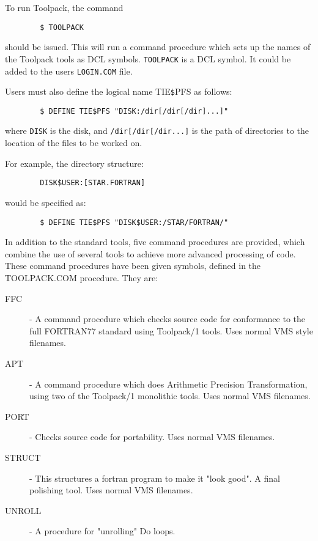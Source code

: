 To run Toolpack, the command
\begin{verbatim}
        $ TOOLPACK
\end{verbatim}
should be issued. This will run a command procedure which sets up the names
of the Toolpack tools as DCL symbols. {\tt TOOLPACK} is a DCL symbol. It could
be added to the users {\tt LOGIN.COM} file.

Users must also define the logical name TIE{\tt{\$}}PFS as follows:
\begin{verbatim}
        $ DEFINE TIE$PFS "DISK:/dir[/dir[/dir]...]"
\end{verbatim}
where {\tt DISK} is the disk, and {\tt /dir[/dir[/dir...]} is the path of
directories to the location of the files to be worked on.

For example, the directory
structure:
\begin{verbatim}
        DISK$USER:[STAR.FORTRAN]
\end{verbatim}
would be specified as:
\begin{verbatim}
        $ DEFINE TIE$PFS "DISK$USER:/STAR/FORTRAN/"
\end{verbatim}
In addition to the standard tools, five command procedures are provided, which
combine the use of several tools to achieve more advanced processing of code.
These command procedures have been given symbols, defined in the TOOLPACK.COM
procedure. They are:
\begin{description}
\item [FFC] -
A command procedure which checks source code for conformance to the full
FORTRAN77 standard using Toolpack/1 tools. Uses normal VMS style filenames.
\item [APT] -
A command procedure which does Arithmetic Precision Transformation, using two
of the Toolpack/1 monolithic tools. Uses normal VMS filenames.
\item [PORT] -
Checks source code for portability. Uses normal VMS filenames.
\item [STRUCT] -
This structures a fortran program to make it "look good". A final polishing
tool. Uses normal VMS filenames.
\item [UNROLL] -
A procedure for "unrolling" Do loops.
\end{description}

